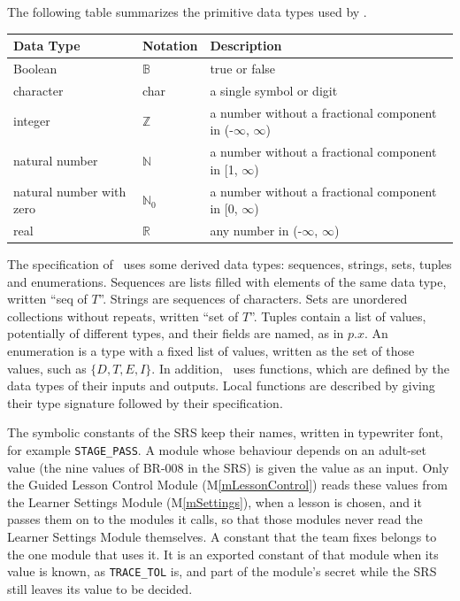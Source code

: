 \documentclass[12pt, titlepage]{article}
\newcommand{\mref}[1]{M\ref{#1}}
\begin{document}
The following table summarizes the primitive data types used by \progname.

\begin{center}
\renewcommand{\arraystretch}{1.2}
\noindent
\begin{tabular}{l l p{7.5cm}}
\toprule
\textbf{Data Type} & \textbf{Notation} & \textbf{Description}\\
\midrule
Boolean & $\mathbb{B}$ & true or false\\
character & char & a single symbol or digit\\
integer & $\mathbb{Z}$ & a number without a fractional component in (-$\infty$, $\infty$) \\
natural number & $\mathbb{N}$ & a number without a fractional component in [1, $\infty$) \\
natural number with zero & $\mathbb{N}_0$ & a number without a fractional
component in [0, $\infty$)\\
real & $\mathbb{R}$ & any number in (-$\infty$, $\infty$)\\
\bottomrule
\end{tabular}
\end{center}

\noindent
The specification of \progname \ uses some derived data types: sequences,
strings, sets, tuples and enumerations. Sequences are lists filled with
elements of the same data type, written ``seq of $T$''. Strings are sequences
of characters. Sets are unordered collections without repeats, written ``set
of $T$''. Tuples contain a list of values, potentially of different types, and
their fields are named, as in $p.x$. An enumeration is a type with a fixed list
of values, written as the set of those values, such as $\{D, T, E, I\}$. In
addition, \progname \ uses functions, which are defined by the data types of
their inputs and outputs. Local functions are described by giving their type
signature followed by their specification.

The symbolic constants of the SRS keep their names, written in typewriter font,
for example \texttt{STAGE\_PASS}. A module whose behaviour depends on an
adult-set value (the nine values of BR-008 in the SRS) is given the value as
an input. Only the Guided Lesson Control Module (\mref{mLessonControl}) reads
these values from the Learner Settings Module (\mref{mSettings}), when a lesson
is chosen, and it passes them on to the modules it calls, so that those modules
never read the Learner Settings Module themselves. A constant that the team
fixes belongs to the one module that uses it. It is an exported constant of
that module when its value is known, as \texttt{TRACE\_TOL} is, and part of the
module's secret while the SRS still leaves its value to be decided.
\end{document}
